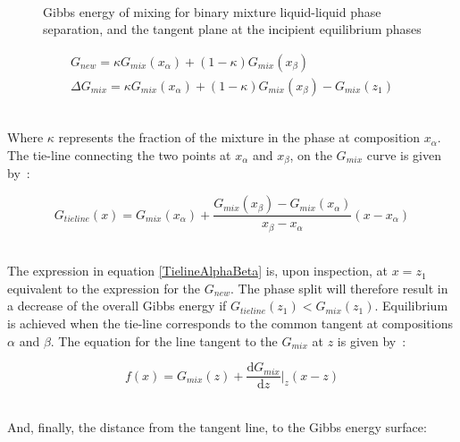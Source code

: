 \begin{figure}[t]
\begin{center}
\resizebox{0.7\textwidth}{!}{}\\
\end{center}
\caption{Gibbs energy of mixing for binary mixture liquid-liquid phase separation, and the tangent plane at the incipient equilibrium phases} \label{TangentPlaneAnalysisDrawing}
\end{figure}	

\begin{eqnarray}
G_{new} = \kappa G_{mix}\left(x_{\alpha}\right) + \left(1-\kappa\right)G_{mix}\left(x_{\beta}\right) \label{GMixNew}\\
\Delta G_{mix} = \kappa G_{mix}\left(x_{\alpha}\right) + \left(1-\kappa\right)G_{mix}\left(x_{\beta}\right) - G_{mix}\left(z_{1}\right) \label{ChangeGMixPhaseSplit}
\end{eqnarray}\

Where $\kappa$ represents the fraction of the mixture in the phase at composition $x_{\alpha}$. The tie-line connecting the two points at $x_{\alpha}$ and $x_{\beta}$, on the $G_{mix}$ curve is given by~\cite{ThermodynamicModels, PhaseEquilCalcsEasyandHard}:\

\begin{equation}
G_{tieline}\left(x\right) = G_{mix}\left(x_{\alpha}\right) + \dfrac{G_{mix}\left(x_{\beta}\right) - G_{mix}\left(x_{\alpha}\right)}{x_{\beta}-x_{\alpha}}\left(x - x_{\alpha}\right) \label{TielineAlphaBeta}
\end{equation}\

The expression in equation \ref{TielineAlphaBeta} is, upon inspection, at $x = z_{1}$ equivalent to the expression for the $G_{new}$. The phase split will therefore result in a decrease of the overall Gibbs energy if $G_{tieline}\left(z_{1}\right) < G_{mix}\left(z_{1}\right)$. Equilibrium is achieved when the tie-line corresponds to the common tangent at compositions $\alpha$ and $\beta$. The equation for the line tangent to the $G_{mix}$ at $z$ is given by~\cite{ThermodynamicModels, PhaseEquilCalcsEasyandHard}:\

\begin{equation}
f\left(x\right) = G_{mix}\left(z\right) + \dfrac{\mathrm{d}G_{mix}}{\mathrm{d}z}\vert_{z}\left(x-z\right) \label{Tangent}
\end{equation}\

And, finally, the distance from the tangent line, to the Gibbs energy surface:\

